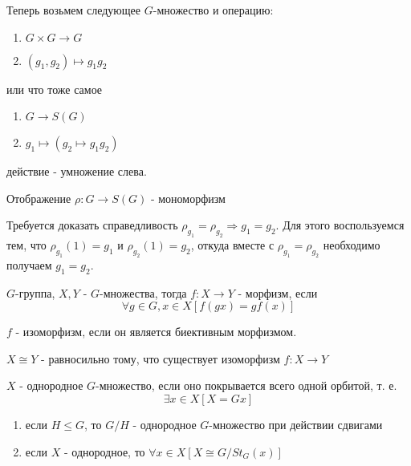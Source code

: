 Теперь возьмем следующее $G$-множество и операцию:

\begin{enumerate}
\item $G\times G \rightarrow G$

\item $\left(g_1, g_2\right) \mapsto g_1g_2$
\end{enumerate}

или что тоже самое

\begin{enumerate}
\item $G \rightarrow S\left(G\right)$

\item $g_1 \mapsto \left(g_2 \mapsto g_1g_2\right)$
\end{enumerate}

действие - умножение слева.

\begin{Th}[Кэли]
Отображение $\rho : G \rightarrow S\left(G\right)$ - мономорфизм
\end{Th}

\begin{Proof}
Требуется доказать справедливость $\rho_{g_1} = \rho_{g_2} \Rightarrow g_1 = g_2$. Для этого воспользуемся тем, что $\rho_{g_1} \left(1\right) = g_1$ и $\rho_{g_2} \left(1\right) = g_2$, откуда вместе с $\rho_{g_1} = \rho_{g_2}$ необходимо получаем $g_1 = g_2$.
\end{Proof}

\begin{Def}
$G$-группа, $X,Y$ - $G$-множества, тогда $f : X \rightarrow Y$ - морфизм, если
\[
	\forall g \in G, x \in X \left[f\left(g x\right) = g f\left(x\right)\right]
\]
\end{Def}

\begin{Def}
$f$ - изоморфизм, если он является биективным морфизмом.
\end{Def}

\begin{Def}
$X \cong Y$ - равносильно тому, что существует изоморфизм $f : X \rightarrow Y$
\end{Def}

\begin{Def}
$X$ - однородное $G$-множество, если оно покрывается всего одной орбитой, т. е.
\[
	\exists x \in X \left[X = Gx\right]
\]
\end{Def}

\begin{Th}
\begin{enumerate}
\item если $H \le G$, то $G / H$ - однородное $G$-множество при действии сдвигами

\item если $X$ - однородное, то $\forall x \in X \left[X \cong G / St_G\left(x\right)\right]$
\end{enumerate}
\end{Th}

